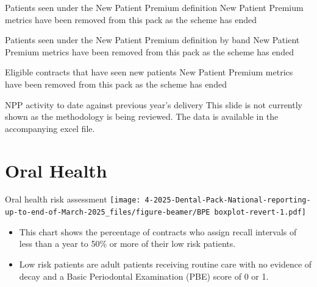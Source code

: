 \documentclass[
  8pt,
  ignorenonframetext,
  aspectratio = 169]{beamer}
\providecommand{\tightlist}{%
  \setlength{\itemsep}{0pt}\setlength{\parskip}{0pt}}
\begin{document}
\begin{frame}{Patients seen under the New Patient Premium definition}
\protect\hypertarget{patients-seen-under-the-new-patient-premium-definition}{}
New Patient Premium metrics have been removed from this pack as the
scheme has ended
\end{frame}

\begin{frame}{Patients seen under the New Patient Premium definition by
band}
\protect\hypertarget{patients-seen-under-the-new-patient-premium-definition-by-band}{}
New Patient Premium metrics have been removed from this pack as the
scheme has ended
\end{frame}

\begin{frame}{Eligible contracts that have seen new patients}
\protect\hypertarget{eligible-contracts-that-have-seen-new-patients}{}
New Patient Premium metrics have been removed from this pack as the
scheme has ended
\end{frame}

\begin{frame}{NPP activity to date against previous year's delivery}
\protect\hypertarget{npp-activity-to-date-against-previous-years-delivery}{}
This slide is not currently shown as the methodology is being reviewed.
The data is available in the accompanying excel file.
\end{frame}

\hypertarget{oral-health}{%
\section{Oral Health}\label{oral-health}}

\begin{frame}{Oral health risk assessment}
\protect\hypertarget{oral-health-risk-assessment}{}
\texttt{[image: 4-2025-Dental-Pack-National-reporting-up-to-end-of-March-2025\_files/figure-beamer/BPE boxplot-revert-1.pdf]}

\begin{itemize}
\tightlist
\item
  This chart shows the percentage of contracts who assign recall
  intervals of less than a year to 50\% or more of their low risk
  patients.
\item
  Low risk patients are adult patients receiving routine care with no
  evidence of decay and a Basic Periodontal Examination (PBE) score of 0
  or 1.
\end{itemize}
\end{frame}
\end{document}
